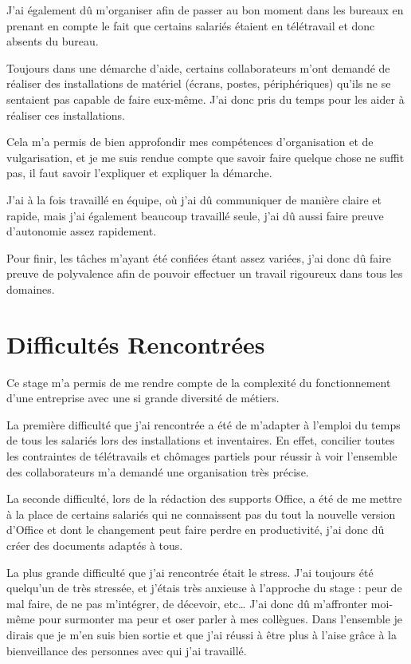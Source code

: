 J'ai également dû m'organiser afin de passer au bon moment dans les bureaux en prenant en compte le fait que certains salariés étaient en télétravail et donc absents du bureau.

Toujours dans une démarche d'aide, certains collaborateurs m'ont demandé de réaliser des installations de matériel (écrans, postes, périphériques) qu'ils ne se sentaient pas capable de faire eux-même. J'ai donc pris du temps pour les aider à réaliser ces installations.

Cela m'a permis de bien approfondir mes compétences d'organisation et de vulgarisation, et je me suis rendue compte que savoir faire quelque chose ne suffit pas, il faut savoir l'expliquer et expliquer la démarche.

J'ai à la fois travaillé en équipe, où j'ai dû communiquer de manière claire et rapide, mais j'ai également beaucoup travaillé seule, j'ai dû aussi faire preuve d'autonomie assez rapidement.

Pour finir, les tâches m’ayant été confiées étant assez variées, j’ai donc dû faire preuve de polyvalence afin de pouvoir effectuer un travail rigoureux dans tous les domaines.

\section{Difficultés Rencontrées}

Ce stage m'a permis de me rendre compte de la complexité du fonctionnement d'une entreprise avec une si grande diversité de métiers.

La première difficulté que j'ai rencontrée a été de m'adapter à l'emploi du temps de tous les salariés lors des installations et inventaires.
En effet, concilier toutes les contraintes de télétravails et chômages partiels pour réussir à voir l'ensemble des collaborateurs m'a demandé une organisation très précise.

La seconde difficulté, lors de la rédaction des supports Office, a été de me mettre à la place de certains salariés qui ne connaissent pas du tout la nouvelle version d’Office et dont le changement peut faire perdre en productivité, j’ai donc dû créer des documents adaptés à tous.

La plus grande difficulté que j’ai rencontrée était le stress. J’ai toujours été quelqu’un de très stressée, et j’étais très anxieuse à l’approche du stage : peur de mal faire, de ne pas m’intégrer, de décevoir, etc\dots
J’ai donc dû m’affronter moi-même pour surmonter ma peur et oser parler à mes collègues. Dans l’ensemble je dirais que je m’en suis bien sortie et que j’ai réussi à être plus à l’aise grâce à la bienveillance des personnes avec qui j’ai travaillé.


